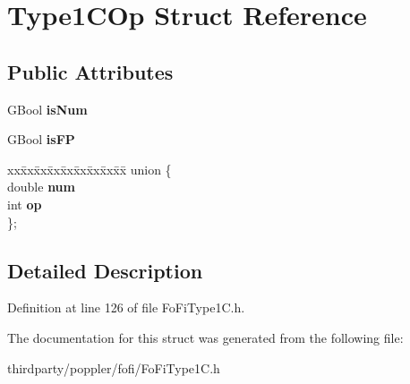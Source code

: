 \hypertarget{struct_type1_c_op}{}\section{Type1\+C\+Op Struct Reference}
\label{struct_type1_c_op}
\subsection*{Public Attributes}
\begin{DoxyCompactItemize}
\item 
\mbox{\label{struct_type1_c_op_a31d049af2dc83ecd65d914fa0e6e0686}} 
G\+Bool {\bfseries is\+Num}
\item 
\mbox{\label{struct_type1_c_op_aa0950101f902aeb3e12c8e30731be23f}} 
G\+Bool {\bfseries is\+FP}
\item 
\mbox{\label{struct_type1_c_op_a82182c9e7eddf23f4df6468f5c9b7570}} 
\begin{tabbing}
xx\=xx\=xx\=xx\=xx\=xx\=xx\=xx\=xx\=\kill
union \{\\
\>double {\bfseries num}\\
\>int {\bfseries op}\\
\}; \\

\end{tabbing}\end{DoxyCompactItemize}


\subsection{Detailed Description}


Definition at line 126 of file Fo\+Fi\+Type1\+C.\+h.



The documentation for this struct was generated from the following file\+:\begin{DoxyCompactItemize}
\item 
thirdparty/poppler/fofi/Fo\+Fi\+Type1\+C.\+h\end{DoxyCompactItemize}
